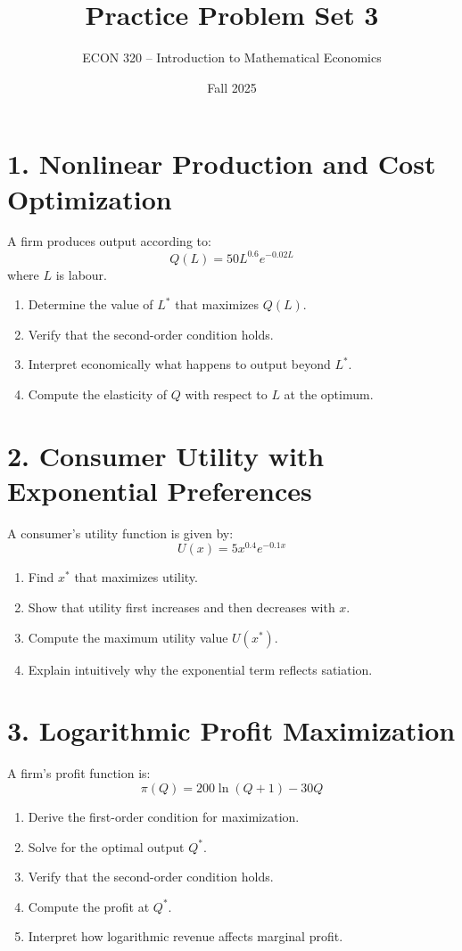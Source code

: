 \documentclass[12pt]{article}
\title{Practice Problem Set 3}
\author{ECON 320 -- Introduction to Mathematical Economics}
\date{Fall 2025}
\begin{document}
\maketitle



\section*{1. Nonlinear Production and Cost Optimization}

A firm produces output according to:
\[
Q(L) = 50L^{0.6}e^{-0.02L}
\]
where \(L\) is labour.

\begin{enumerate}
\item Determine the value of \(L^*\) that maximizes \(Q(L)\).
\item Verify that the second-order condition holds.
\item Interpret economically what happens to output beyond \(L^*\).
\item Compute the elasticity of \(Q\) with respect to \(L\) at the optimum.
\end{enumerate}



\section*{2. Consumer Utility with Exponential Preferences}

A consumer’s utility function is given by:
\[
U(x) = 5x^{0.4}e^{-0.1x}
\]

\begin{enumerate}
\item Find \(x^*\) that maximizes utility.
\item Show that utility first increases and then decreases with \(x\).
\item Compute the maximum utility value \(U(x^*)\).
\item Explain intuitively why the exponential term reflects satiation.
\end{enumerate}



\section*{3. Logarithmic Profit Maximization}

A firm’s profit function is:
\[
\pi(Q) = 200\ln(Q + 1) - 30Q
\]

\begin{enumerate}
\item Derive the first-order condition for maximization.
\item Solve for the optimal output \(Q^*\).
\item Verify that the second-order condition holds.
\item Compute the profit at \(Q^*\).
\item Interpret how logarithmic revenue affects marginal profit.
\end{enumerate}
\end{document}
